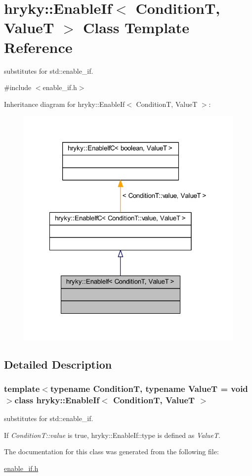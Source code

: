 \hypertarget{classhryky_1_1_enable_if}{\section{hryky\-:\-:Enable\-If$<$ Condition\-T, Value\-T $>$ Class Template Reference}
\label{classhryky_1_1_enable_if}
}


substitutes for std\-::enable\-\_\-if.  




{\ttfamily \#include $<$enable\-\_\-if.\-h$>$}



Inheritance diagram for hryky\-:\-:Enable\-If$<$ Condition\-T, Value\-T $>$\-:
\nopagebreak
\begin{figure}[H]
\begin{center}
\leavevmode
\includegraphics[width=318pt]{classhryky_1_1_enable_if__inherit__graph}
\end{center}
\end{figure}


\subsection{Detailed Description}
\subsubsection*{template$<$typename Condition\-T, typename Value\-T = void$>$class hryky\-::\-Enable\-If$<$ Condition\-T, Value\-T $>$}

substitutes for std\-::enable\-\_\-if. 

If {\itshape Condition\-T\-::value\/} is true, hryky\-::\-Enable\-If\-::type is defined as {\itshape Value\-T\/}. 

The documentation for this class was generated from the following file\-:\begin{DoxyCompactItemize}
\item 
\hyperlink{enable__if_8h}{enable\-\_\-if.\-h}\end{DoxyCompactItemize}
